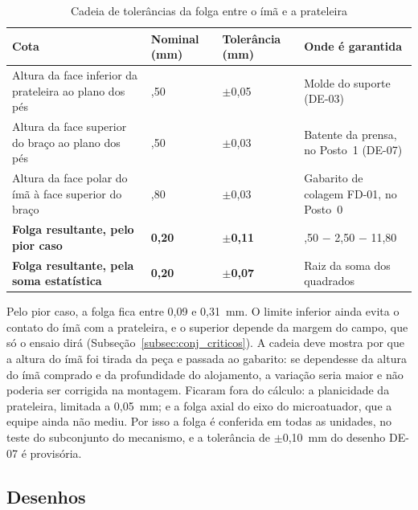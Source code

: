 \begin{table}[htbp]
    \centering
    \caption{Cadeia de tolerâncias da folga entre o ímã e a prateleira}
    \label{tab:des_cadeia}
    \footnotesize
    \renewcommand{\arraystretch}{1.3}
    \begin{tabularx}{\textwidth}{@{}
        >{\RaggedRight\arraybackslash}X
        >{\centering\arraybackslash}p{2.2cm}
        >{\centering\arraybackslash}p{2.0cm}
        >{\RaggedRight\arraybackslash}p{4.6cm}@{}}
        \toprule
        \textbf{Cota} & \textbf{Nominal (mm)} & \textbf{Tolerância (mm)} & \textbf{Onde é garantida} \\
        \midrule
        Altura da face inferior da prateleira ao plano dos pés & 14,50 & $\pm$0,05 & Molde do suporte (DE-03) \\
        Altura da face superior do braço ao plano dos pés & 2,50 & $\pm$0,03 & Batente da prensa, no Posto~1 (DE-07) \\
        Altura da face polar do ímã à face superior do braço & 11,80 & $\pm$0,03 & Gabarito de colagem FD-01, no Posto~0 \\
        \midrule
        \textbf{Folga resultante, pelo pior caso} & \textbf{0,20} & \textbf{$\pm$0,11} & 14,50 $-$ 2,50 $-$ 11,80 \\
        \textbf{Folga resultante, pela soma estatística} & \textbf{0,20} & \textbf{$\pm$0,07} & Raiz da soma dos quadrados \\
        \bottomrule
    \end{tabularx}
\end{table}

Pelo pior caso, a folga fica entre 0,09 e 0,31~mm. O limite inferior ainda evita o contato do ímã com a prateleira, e o superior depende da margem do campo, que só o ensaio dirá (Subseção~\ref{subsec:conj_criticos}). A cadeia deve mostra por que a altura do ímã foi tirada da peça e passada ao gabarito: se dependesse da altura do ímã comprado e da profundidade do alojamento, a variação seria maior e não poderia ser corrigida na montagem. Ficaram fora do cálculo: a planicidade da prateleira, limitada a 0,05~mm; e a folga axial do eixo do microatuador, que a equipe ainda não mediu. Por isso a folga é conferida em todas as unidades, no teste do subconjunto do mecanismo, e a tolerância de $\pm$0,10~mm do desenho DE-07 é provisória.

\subsection{Desenhos}
\label{subsec:des_folhas}


